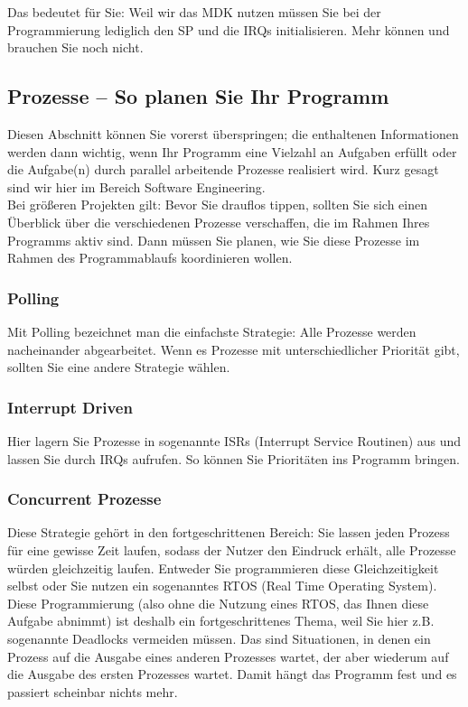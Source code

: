 Das bedeutet für Sie: Weil wir das MDK nutzen müssen Sie bei der Programmierung lediglich den SP und die IRQs initialisieren. Mehr können und brauchen Sie noch nicht.

\subsection{Prozesse – So planen Sie Ihr Programm}

Diesen Abschnitt können Sie vorerst überspringen; die enthaltenen Informationen werden dann wichtig, wenn Ihr Programm eine Vielzahl an Aufgaben erfüllt oder die Aufgabe(n) durch parallel arbeitende Prozesse realisiert wird. Kurz gesagt sind wir hier im Bereich Software Engineering.\\

Bei größeren Projekten gilt: Bevor Sie drauflos tippen, sollten Sie sich einen Überblick über die verschiedenen Prozesse verschaffen, die im Rahmen Ihres Programms aktiv sind. Dann müssen Sie planen, wie Sie diese Prozesse im Rahmen des Programmablaufs koordinieren wollen.

\subsubsection{Polling}

Mit Polling bezeichnet man die einfachste Strategie: Alle Prozesse werden nacheinander abgearbeitet. Wenn es Prozesse mit unterschiedlicher Priorität gibt, sollten Sie eine andere Strategie wählen.

\subsubsection{Interrupt Driven}

Hier lagern Sie Prozesse in sogenannte ISRs (Interrupt Service Routinen) aus und lassen Sie durch IRQs aufrufen. So können Sie Prioritäten ins Programm bringen.

\subsubsection{Concurrent Prozesse}

Diese Strategie gehört in den fortgeschrittenen Bereich: Sie lassen jeden Prozess für eine gewisse Zeit laufen, sodass der Nutzer den Eindruck erhält, alle Prozesse würden gleichzeitig laufen. Entweder Sie programmieren diese Gleichzeitigkeit selbst oder Sie nutzen ein sogenanntes RTOS (Real Time Operating System). Diese Programmierung (also ohne die Nutzung eines RTOS, das Ihnen diese Aufgabe abnimmt) ist deshalb ein fortgeschrittenes Thema, weil Sie hier z.B. sogenannte Deadlocks vermeiden müssen. Das sind Situationen, in denen ein Prozess auf die Ausgabe eines anderen Prozesses wartet, der aber wiederum auf die Ausgabe des ersten Prozesses wartet. Damit hängt das Programm fest und es passiert scheinbar nichts mehr.\\

